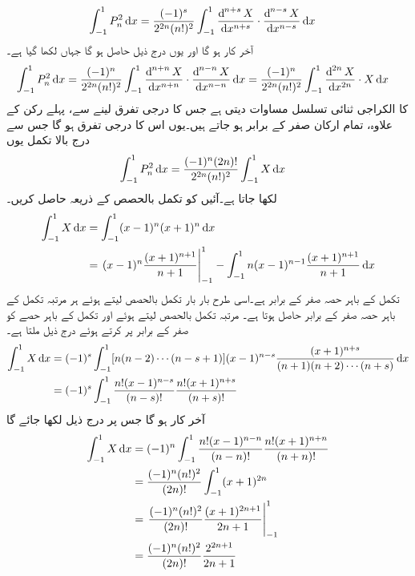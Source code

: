  \begin{align*}
\int_{-1}^{1} P_n^2  \dif x&=\frac{(-1)^s}{2^{2n}(n!)^2}\int_{-1}^{1}\frac{\dif^{\,n+s} X}{\dif x^{n+s}} \cdot \frac{\dif^{\,n-s}X}{\dif x^{n-s}}\dif x
\end{align*}
آخر کار  ہو گا اور یوں درج ذیل حاصل ہو گا جہاں  لکھا گیا ہے۔
 \begin{align*}
\int_{-1}^{1} P_n^2  \dif x&=\frac{(-1)^n}{2^{2n}(n!)^2}\int_{-1}^{1}\frac{\dif^{\,n+n} X}{\dif x^{n+n}} \cdot \frac{\dif^{\,n-n}X}{\dif x^{n-n}} \dif x=\frac{(-1)^n}{2^{2n}(n!)^2}\int_{-1}^{1}\frac{\dif^{\,2n} X}{\dif x^{2n}} \cdot X \dif x
\end{align*}
  کا الکراجی ثنائی تسلسل مساوات  دیتی ہے جس کا درجی تفرق لینے سے، پہلے رکن کے علاوہ، تمام ارکان صفر کے برابر ہو جاتے ہیں۔یوں اس کا  درجی تفرق   ہو گا جس سے درج بالا تکمل یوں
 \begin{align}\label{مساوات_بیسل_سوال_عمومی_ت}
\int_{-1}^{1} P_n^2  \dif x&=\frac{(-1)^n (2n)!}{2^{2n}(n!)^2}\int_{-1}^{1} X \dif x
\end{align}
لکھا جاتا ہے۔آئیں  کو تکمل بالحصص کے ذریعہ حاصل کریں۔
\begin{align*}
\int_{-1}^{1}X\dif x&=\int_{-1}^{1} (x-1)^n(x+1)^n\dif x\\
&=\left.(x-1)^n\frac{(x+1)^{n+1}}{n+1} \right|_{-1}^{1}-\int_{-1}^{1} n(x-1)^{n-1}\frac{(x+1)^{n+1}}{n+1}\dif x
\end{align*}
تکمل کے باہر حصہ صفر کے برابر ہے۔اسی طرح بار بار تکمل بالحصص لیتے ہوئے ہر مرتبہ تکمل کے باہر حصہ صفر کے برابر حاصل ہوتا ہے۔ مرتبہ تکمل بالحصص لیتے ہوئے اور تکمل کے باہر حصے کو صفر کے برابر پر کرتے ہوئے  درج ذیل ملتا ہے۔
\begin{align*}
\int_{-1}^{1}X\dif x&=(-1)^s\int_{-1}^{1} [n(n-2)\cdots (n-s+1)](x-1)^{n-s}\frac{(x+1)^{n+s}}{(n+1)(n+2)\cdots (n+s)}\dif x\\
&=(-1)^s\int_{-1}^{1} \frac{n! (x-1)^{n-s}}{(n-s)!} \frac{n!(x+1)^{n+s}}{(n+s)!}
\end{align*}
آخر کار  ہو گا جس پر درج ذیل لکھا جائے گا
\begin{align*}
\int_{-1}^{1}X\dif x&=(-1)^n\int_{-1}^{1} \frac{n! (x-1)^{n-n}}{(n-n)!} \frac{n!(x+1)^{n+n}}{(n+n)!}\\
&=\frac{(-1)^n(n!)^2}{(2n)!}\int_{-1}^{1} (x+1)^{2n}\\
&=\left. \frac{(-1)^n(n!)^2}{(2n)!}\frac{(x+1)^{2n+1}}{2n+1}\right|_{-1}^{1}\\
&=\frac{(-1)^n(n!)^2}{(2n)!}\frac{2^{2n+1}}{2n+1}
\end{align*}
